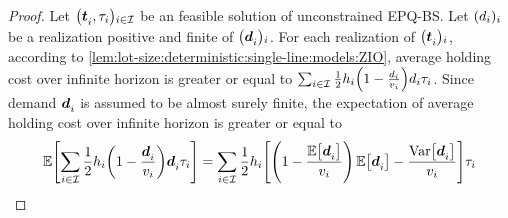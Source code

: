 \begin{proof}
Let $\bracket{\va t_i,\cover_i}_{i\in\REF}$ be an feasible solution of unconstrained EPQ-BS.
Let $\bracket{\demand_i}_i$ be a realization positive and finite of $\bracket{\va\demand_i}_i$.
For each realization of $\bracket{\va t_i}_i$, according to \cref{lem:lot-size:deterministic:single-line:models:ZIO}, average holding cost over infinite horizon is greater or equal to 
$\sum_{i\in\REF}\frac{1}{2}\holding_i\bracket{1-\frac{\demand_i}{\rate_i}}\demand_i\cover_i$.
Since demand $\va\demand_i$ is assumed to be almost surely finite, the expectation of average holding cost over infinite horizon is greater or equal to 
\begin{equation}
  \espe\sqbracket{\sum_{i\in\REF}\frac{1}{2}\holding_i\bracket{1-\frac{\va\demand_i}{\rate_i}}\va\demand_i\cover_i}
  =
  \sum_{i\in\REF}\frac{1}{2}\holding_i\sqbracket{\bracket{1-\frac{\espe\sqbracket{\va\demand_i}}{\rate_i}}\espe\sqbracket{\va\demand_i} - \frac{\vari\sqbracket{\va\demand_i}}{\rate_i}}\cover_i
\end{equation}

\end{proof}
